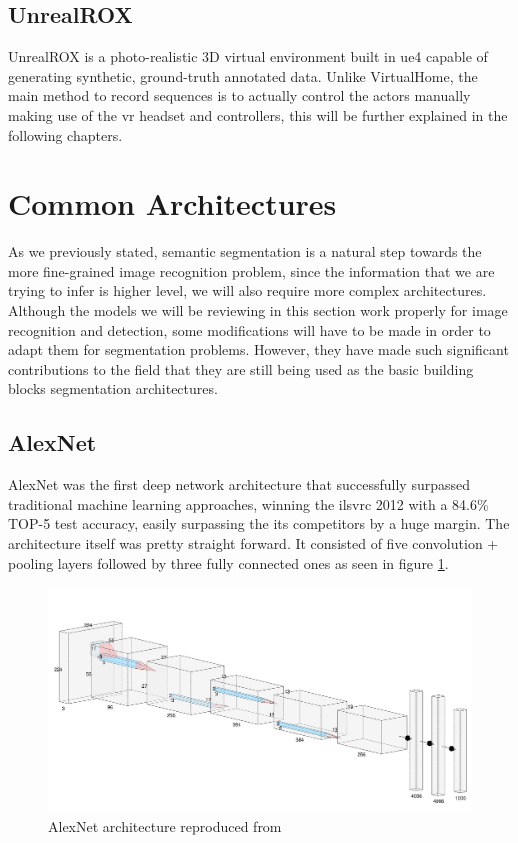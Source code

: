 \subsection{UnrealROX}
UnrealROX \cite{DBLP:journals/corr/abs-1810-06936} is a photo-realistic 3D virtual environment built in \gls{ue4} capable of generating synthetic, ground-truth annotated data. Unlike VirtualHome, the main method to record sequences is to actually control the actors manually making use of the \gls{vr} headset and controllers, this will be further explained in the following chapters.

\section{Common Architectures}
\label{sec:architectures}
As we previously stated, semantic segmentation is a natural step towards the more fine-grained image recognition problem, since the information that we are trying to infer is higher level, we will also require more complex architectures. Although the models we will be reviewing in this section work properly for image recognition and detection, some modifications will have to be made in order to adapt them for segmentation problems. However, they have made such significant contributions to the field that they are still being used as the basic building blocks segmentation architectures.

\subsection{AlexNet}
AlexNet was the first deep network architecture that successfully surpassed traditional machine learning approaches, winning the \gls{ilsvrc} 2012 with a 84.6\% TOP-5 test accuracy, easily surpassing the its competitors by a huge margin. The architecture itself was pretty straight forward. It consisted of five convolution + pooling layers followed by three fully connected ones as seen in figure \ref{alexnet}.


\begin{figure}[h]
	\includegraphics[scale=0.3]{archivos/alexnet.png}
	\centering
	\caption{AlexNet architecture reproduced from \cite{AlexNet}}
	\label{alexnet}
\end{figure}

